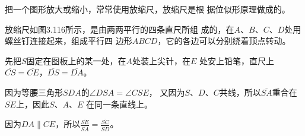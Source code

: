 \begin{figure}
    \begin{minipage}[t]{0.48\linewidth}
    \centering
  \begin{tikzpicture}[>=latex, scale=1]
    \end{tikzpicture}
    \caption{}
    \end{minipage}
    \begin{minipage}[t]{0.48\linewidth}
    \centering
    \begin{tikzpicture}[>=latex, scale=1]
    \end{tikzpicture}
    \caption{}
    \end{minipage}
    \end{figure}

把一个图形放大或缩小，常常使用放缩尺，放缩尺是根
据位似形原理做成的。

放缩尺如图3.116所示，是由两两平行的四条直尺所组
成的，在$A$、$B$、$C$、$D$处用螺丝钉连接起来，组成平行四
边形$ABCD$，它的各边可以分别绕着顶点转动。

\begin{figure}
    \centering
    \caption{}
\end{figure}

先把$S$固定在图板上的某一处，在$A$处装上尖针，在$E$
处安上铅笔，直尺上$\overline{CS}=\overline{CE}$，$\overline{DS}=\overline{DA}$。

因为等腰三角形$SDA$的$\angle DSA=\angle CSE$，
又因为$S$、$D$、$C$共线，所以$\overline{SA}$重合在$\overline{SE}$上，因此$S$、$A$、$E$
在同一条直线上。

因为$DA\parallel CE$，所以$\frac{\overline{SE}}{\overline{SA}}=\frac{\overline{SC}}{\overline{SD}}$。

